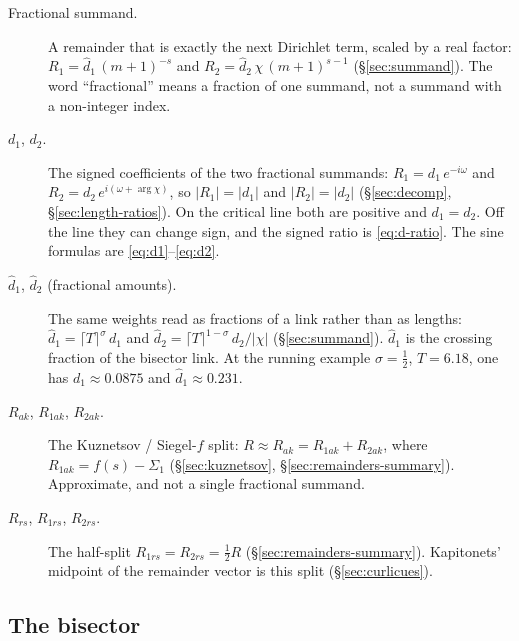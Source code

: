 \documentclass[11pt]{article}
\theoremstyle{definition}
\begin{document}
\begin{description}
\item[Fractional summand.]
A remainder that is exactly the next Dirichlet term, scaled by a
real factor: $R_{1}=\hat d_1\,(m+1)^{-s}$ and
$R_{2}=\hat d_2\,\chi\,(m+1)^{s-1}$
(\S\ref{sec:summand}).
The word ``fractional'' means a fraction of one summand, not a
summand with a non-integer index.

\item[$d_1$, $d_2$.]
The signed coefficients of the two fractional summands:
$R_{1}=d_1\,e^{-i\omega}$ and $R_{2}=d_2\,e^{i(\omega+\arg\chi)}$,
so $|R_{1}|=|d_1|$ and $|R_{2}|=|d_2|$
(\S\ref{sec:decomp}, \S\ref{sec:length-ratios}).
On the critical line both are positive and $d_1=d_2$.
Off the line they can change sign, and the signed ratio is
\eqref{eq:d-ratio}.
The sine formulas are \eqref{eq:d1}--\eqref{eq:d2}.

\item[$\hat d_1$, $\hat d_2$ (fractional amounts).]
The same weights read as fractions of a link rather than as
lengths:
$\hat d_1=\lceil T\rceil^{\sigma}\,d_1$ and
$\hat d_2=\lceil T\rceil^{1-\sigma}\,d_2/|\chi|$
(\S\ref{sec:summand}).
$\hat d_1$ is the crossing fraction of the bisector link.
At the running example $\sigma=\tfrac12$, $T=6.18$, one has
$d_1\approx0.0875$ and $\hat d_1\approx0.231$.

\item[$R_{ak}$, $R_{1ak}$, $R_{2ak}$.]
The Kuznetsov / Siegel-$f$ split:
$R\approx R_{ak}=R_{1ak}+R_{2ak}$, where
$R_{1ak}=f(s)-\Sigma_1$
(\S\ref{sec:kuznetsov}, \S\ref{sec:remainders-summary}).
Approximate, and not a single fractional summand.

\item[$R_{rs}$, $R_{1rs}$, $R_{2rs}$.]
The half-split $R_{1rs}=R_{2rs}=\tfrac12 R$
(\S\ref{sec:remainders-summary}).
Kapitonets' midpoint of the remainder vector is this split
(\S\ref{sec:curlicues}).
\end{description}

\subsection*{The bisector}
\end{document}
